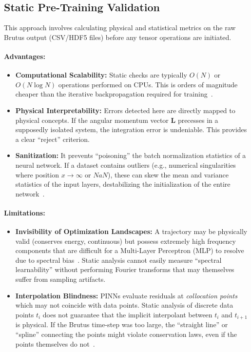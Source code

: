 \documentclass[11pt, a4paper]{article}
\newcommand{\vect}[1]{\mathbf{#1}} %
\begin{document}
\subsection{Static Pre-Training Validation}

This approach involves calculating physical and statistical metrics on the raw Brutus output (CSV/HDF5 files) before any tensor operations are initiated.

\paragraph{Advantages:}
\begin{itemize}
    \item \textbf{Computational Scalability:} Static checks are typically $O(N)$ or $O(N \log N)$ operations performed on CPUs. This is orders of magnitude cheaper than the iterative backpropagation required for training~\cite{ref12}.
    \item \textbf{Physical Interpretability:} Errors detected here are directly mapped to physical concepts. If the angular momentum vector $\vect{L}$ precesses in a supposedly isolated system, the integration error is undeniable. This provides a clear ``reject'' criterion.
    \item \textbf{Sanitization:} It prevents ``poisoning'' the batch normalization statistics of a neural network. If a dataset contains outliers (e.g., numerical singularities where position $x \to \infty$ or $NaN$), these can skew the mean and variance statistics of the input layers, destabilizing the initialization of the entire network~\cite{ref13}.
\end{itemize}

\paragraph{Limitations:}
\begin{itemize}
    \item \textbf{Invisibility of Optimization Landscapes:} A trajectory may be physically valid (conserves energy, continuous) but possess extremely high frequency components that are difficult for a Multi-Layer Perceptron (MLP) to resolve due to spectral bias~\cite{ref8}. Static analysis cannot easily measure ``spectral learnability'' without performing Fourier transforms that may themselves suffer from sampling artifacts.
    \item \textbf{Interpolation Blindness:} PINNs evaluate residuals at \textit{collocation points} which may not coincide with data points. Static analysis of discrete data points $t_i$ does not guarantee that the implicit interpolant between $t_i$ and $t_{i+1}$ is physical. If the Brutus time-step was too large, the ``straight line'' or ``spline'' connecting the points might violate conservation laws, even if the points themselves do not~\cite{ref16}.
\end{itemize}
\end{document}
